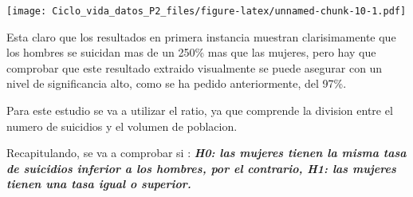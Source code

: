 \documentclass[]{article}
\newenvironment{Shaded}{\begin{snugshade}}{\end{snugshade}}
\newcommand{\KeywordTok}[1]{\textcolor[rgb]{0.13,0.29,0.53}{\textbf{#1}}}
\newcommand{\DataTypeTok}[1]{\textcolor[rgb]{0.13,0.29,0.53}{#1}}
\newcommand{\DecValTok}[1]{\textcolor[rgb]{0.00,0.00,0.81}{#1}}
\newcommand{\StringTok}[1]{\textcolor[rgb]{0.31,0.60,0.02}{#1}}
\newcommand{\CommentTok}[1]{\textcolor[rgb]{0.56,0.35,0.01}{\textit{#1}}}
\newcommand{\OperatorTok}[1]{\textcolor[rgb]{0.81,0.36,0.00}{\textbf{#1}}}
\newcommand{\NormalTok}[1]{#1}
\begin{document}
\begin{Shaded}
\end{Shaded}

\texttt{[image: Ciclo\_vida\_datos\_P2\_files/figure-latex/unnamed-chunk-10-1.pdf]}

Esta claro que los resultados en primera instancia muestran
clarisimamente que los hombres se suicidan mas de un 250\% mas que las
mujeres, pero hay que comprobar que este resultado extraido visualmente
se puede asegurar con un nivel de significancia alto, como se ha pedido
anteriormente, del 97\%.

Para este estudio se va a utilizar el ratio, ya que comprende la
division entre el numero de suicidios y el volumen de poblacion.

Recapitulando, se va a comprobar si : \textbf{\emph{H0: las mujeres
tienen la misma tasa de suicidios inferior a los hombres, por el
contrario, H1: las mujeres tienen una tasa igual o superior.}}
\end{document}
